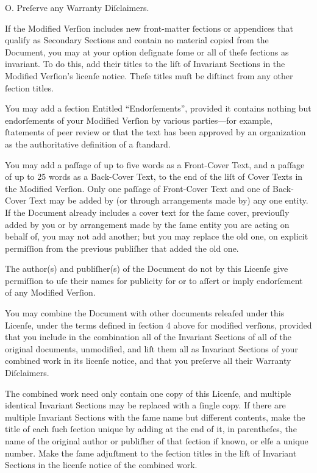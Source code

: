 O. Preſerve any Warranty Diſclaimers.

If the Modified Verſion includes new front-matter ſections or appendices 
that qualify as Secondary Sections and contain no material copied from 
the Document, you may at your option deſignate ſome or all of theſe 
ſections as invariant. To do this, add their titles to the liſt of 
Invariant Sections in the Modified Verſion’s licenſe notice. Theſe 
titles muſt be diſtinct from any other ſection titles.

You may add a ſection Entitled “Endorſements”, provided it contains 
nothing but endorſements of your Modified Verſion by various parties—for 
example, ſtatements of peer review or that the text has been approved by 
an organization as the authoritative definition of a ſtandard.

You may add a paſſage of up to five words as a Front-Cover Text, and a 
paſſage of up to 25 words as a Back-Cover Text, to the end of the liſt 
of Cover Texts in the Modified Verſion. Only one paſſage of Front-Cover 
Text and one of Back-Cover Text may be added by (or through arrangements 
made by) any one entity. If the Document already includes a cover text 
for the ſame cover, previouſly added by you or by arrangement made by 
the ſame entity you are acting on behalf of, you may not add another; 
but you may replace the old one, on explicit permiſſion from the 
previous publiſher that added the old one.

The author(s) and publiſher(s) of the Document do not by this Licenſe 
give permiſſion to uſe their names for publicity for or to aſſert or 
imply endorſement of any Modified Verſion.


You may combine the Document with other documents releaſed under this 
Licenſe, under the terms defined in ſection 4 above for modified 
verſions, provided that you include in the combination all of the 
Invariant Sections of all of the original documents, unmodified, and 
liſt them all as Invariant Sections of your combined work in its licenſe 
notice, and that you preſerve all their Warranty Diſclaimers.

The combined work need only contain one copy of this Licenſe, and 
multiple identical Invariant Sections may be replaced with a ſingle 
copy. If there are multiple Invariant Sections with the ſame name but 
different contents, make the title of each ſuch ſection unique by adding 
at the end of it, in parentheſes, the name of the original author or 
publiſher of that ſection if known, or elſe a unique number. Make the 
ſame adjuſtment to the ſection titles in the liſt of Invariant Sections 
in the licenſe notice of the combined work.

